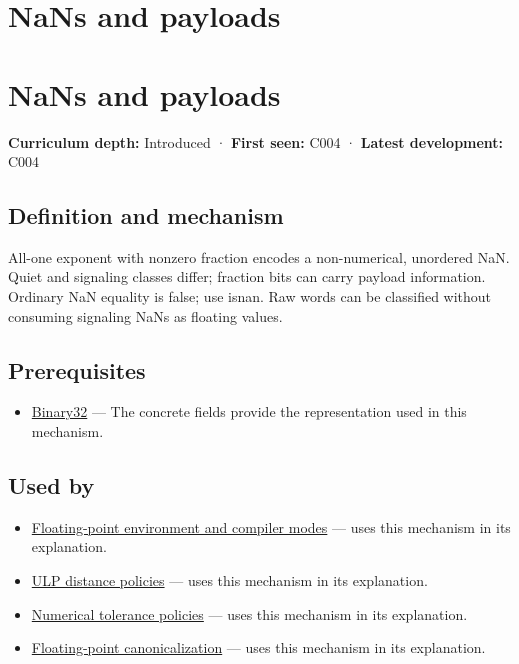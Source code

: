 \hypertarget{appendix-d6607cc4c235}{}
\section*{NaNs and payloads}
\section{NaNs and payloads}\label{appendix-d6607cc4c235-nans-and-payloads}

\textbf{Curriculum depth:} Introduced · \textbf{First seen:} C004 · \textbf{Latest development:} C004

\subsection{Definition and mechanism}\label{appendix-d6607cc4c235-definition-and-mechanism}

All-one exponent with nonzero fraction encodes a non-numerical, unordered NaN. Quiet and signaling classes differ; fraction bits can carry payload information. Ordinary NaN equality is false; use isnan. Raw words can be classified without consuming signaling NaNs as floating values.

\subsection{Prerequisites}\label{appendix-d6607cc4c235-prerequisites}

\begin{itemize}
\tightlist
\item
  \hyperref[appendix-5057f9ad327f]{Binary32} --- The concrete fields provide the representation used in this mechanism.
\end{itemize}

\subsection{Used by}\label{appendix-d6607cc4c235-used-by}

\begin{itemize}
\tightlist
\item
  \hyperref[appendix-f11d1a521253]{Floating-point environment and compiler modes} --- uses this mechanism in its explanation.
\item
  \hyperref[appendix-deca299ae4b8]{ULP distance policies} --- uses this mechanism in its explanation.
\item
  \hyperref[appendix-0ec599f8ba27]{Numerical tolerance policies} --- uses this mechanism in its explanation.
\item
  \hyperref[appendix-e90053a4b201]{Floating-point canonicalization} --- uses this mechanism in its explanation.
\end{itemize}


